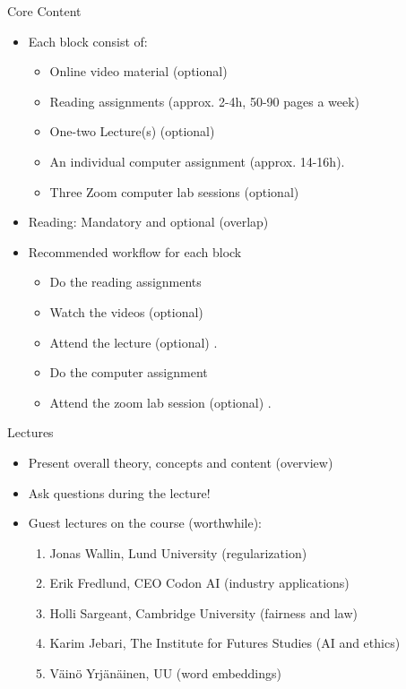 \documentclass[10pt]{beamer}
\begin{document}
\begin{frame}{Core Content}

\begin{itemize}
\item Each block consist of:
\begin{itemize}
\item Online video material (optional)
\item Reading assignments (approx. 2-4h, 50-90 pages a week)
\item One-two Lecture(s) (optional)
\item An individual computer assignment (approx. 14-16h).
\item Three Zoom computer lab sessions (optional)\pause
\end{itemize}
\item Reading: Mandatory and optional (overlap)\pause
\item Recommended workflow for each block
\begin{itemize}
\item Do the reading assignments
\item Watch the videos (optional)
\item Attend the lecture (optional) .
\item Do the computer assignment
\item Attend the zoom lab session (optional) .
\end{itemize}
\end{itemize}
\end{frame}


\begin{frame}{Lectures}

\begin{itemize}
\item Present overall theory, concepts and content (overview) \pause
\item Ask questions during the lecture!
\item Guest lectures on the course (worthwhile):
\begin{enumerate}
\item Jonas Wallin, Lund University (regularization)\pause
\item Erik Fredlund, CEO Codon AI (industry applications)\pause
\item Holli Sargeant, Cambridge University (fairness and law)\pause
\item Karim Jebari, The Institute for Futures Studies (AI and ethics)\pause
\item Väinö Yrjänäinen, UU (word embeddings)
\end{enumerate}
\end{itemize}
\end{frame}
\end{document}
